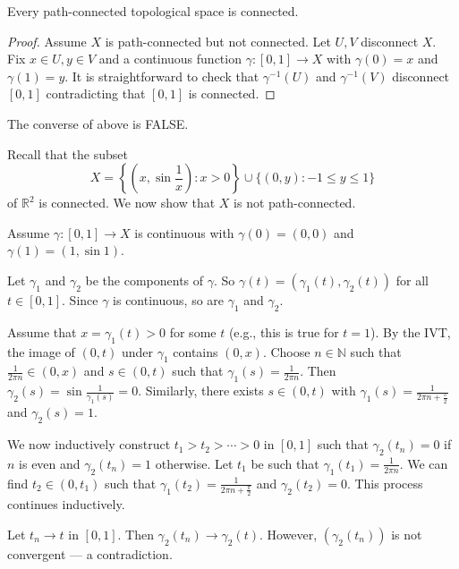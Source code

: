 \documentclass[a4paper,11pt]{article}
\begin{document}
\begin{theorem}\label{thm:path connected is connected}
    Every path-connected topological space is connected.
\end{theorem}

\begin{proof}
    Assume $X$ is path-connected but not connected. Let $U, V$ disconnect $X$. Fix $x \in U, y \in V$ and a continuous function $\gamma:[0,1] \rightarrow X$ with $\gamma(0)=x$ and $\gamma(1)=y$. It is straightforward to check that $\gamma^{-1}(U)$ and $\gamma^{-1}(V)$ disconnect $[0,1]$ contradicting that $[0,1]$ is connected.
\end{proof}
The converse of above is FALSE.
\begin{example}
    Recall that the subset
    \[
        X=\left\{\left(x, \sin \frac{1}{x}\right): x>0\right\} \cup\{(0, y):-1 \leqslant y \leqslant 1\}
    \]
    of $\mathbb{R}^{2}$ is connected. We now show that $X$ is not path-connected.

    Assume $\gamma:[0,1] \rightarrow X$ is continuous with $\gamma(0)=(0,0)$ and $\gamma(1)=(1, \sin 1)$.

    Let $\gamma_{1}$ and $\gamma_{2}$ be the components of $\gamma$. So $\gamma(t)=\left(\gamma_{1}(t), \gamma_{2}(t)\right)$ for all $t \in[0,1]$. Since $\gamma$ is continuous, so are $\gamma_{1}$ and $\gamma_{2}$.

    Assume that $x=\gamma_{1}(t)>0$ for some $t$ (e.g., this is true for $t=1$). By the IVT, the image of $(0, t)$ under $\gamma_{1}$ contains $(0, x)$. Choose $n \in \mathbb{N}$ such that $\frac{1}{2 \pi n} \in(0, x)$ and $s \in(0, t)$ such that $\gamma_{1}(s)=\frac{1}{2 \pi n}$. Then $\gamma_{2}(s)=\sin \frac{1}{\gamma_{1}(s)}=0$. Similarly, there exists $s \in(0, t)$ with $\gamma_{1}(s)=\frac{1}{2 \pi n+\frac{\pi}{2}}$ and $\gamma_{2}(s)=1$. 
    
    We now inductively construct $t_{1}>t_{2}>\cdots>0$ in $[0,1]$ such that $\gamma_{2}\left(t_{n}\right)=0$ if $n$ is even and $\gamma_{2}\left(t_{n}\right)=1$ otherwise. 
    Let $t_1$ be such that $ \gamma_1(t_1) = \frac{1}{2\pi n} $. We can find $ t_2 \in (0,t_1) $ such that $ \gamma_1(t_2) =\frac{1}{2\pi n+\frac{\pi}{2} } $ and $\gamma_2(t_2)=0$. This process continues inductively.
    
    Let $t_{n} \rightarrow t$ in $[0,1]$. Then $\gamma_{2}\left(t_{n}\right) \rightarrow \gamma_{2}(t)$. However, $\left(\gamma_{2}\left(t_{n}\right)\right)$ is not convergent --- a contradiction.
\end{example}
\end{document}
